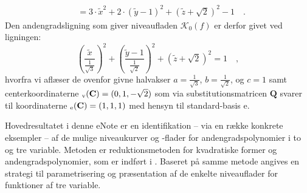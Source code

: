 \begin{example}[Ellipsoidedata]
\begin{equation}
\begin{aligned}
&= 3\cdot \widetilde{x}^{2} + 2\cdot\left(\widetilde{y} - 1 \right)^{2} + \left(\widetilde{z} +\sqrt{2} \right)^{2}-1 \quad.
\end{aligned}
\end{equation}
Den andengradsligning som giver niveaufladen $\mathcal{K}_{0}(f)$ er derfor givet ved ligningen:
\begin{equation}
\left(\frac{\widetilde{x}}{\frac{1}{\sqrt{3}}}\right)^{2} + \left(\frac{\widetilde{y} - 1}{\frac{1}{\sqrt{2}}}\right)^{2} +  \left(\widetilde{z} +\sqrt{2}\right)^{2} = 1 \quad ,
\end{equation}
hvorfra vi aflæser de ovenfor givne halvakser $a =\frac{1}{\sqrt{3}}$, $b=\frac{1}{\sqrt{2}}$, og $c=1$ samt centerkoordinaterne ${_\mathrm{v}\mathbf{(}}\mathbf{C}) = (0, 1, -\sqrt{2})$ som via substitutionsmatricen $\mathbf{Q}$ svarer til koordinaterne ${_\mathrm{e}\mathbf{(}}\mathbf{C}) = (1,1,1)$ med hensyn til standard-basis e.
\end{example}










\begin{summary}
Hovedresultatet i denne eNote er en identifikation -- via en række konkrete eksempler -- af de mulige niveaukurver og -flader for andengradspolynomier i to og tre variable. Metoden er reduktionsmetoden for kvadratiske former og andengradspolynomier,  som er indført i . Baseret på samme metode angives en strategi til parametrisering og præsentation af de enkelte niveauflader for funktioner af tre variable.
\end{summary}






